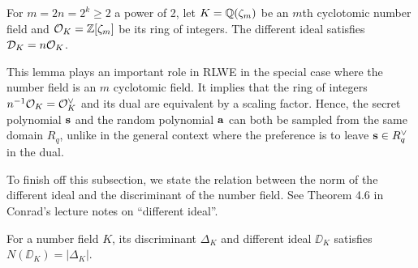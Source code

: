 \documentclass[../main.tex]{subfiles}
\begin{document}
\begin{lemma}
\label{app lm:difIdeal}
\reversemarginpar
{}
For $m=2n=2^k \ge 2$ a power of 2, let $K=\mathbb{Q}(\zeta_m)$ be an $m$th cyclotomic number field and $\mathcal{O}_K=\mathbb{Z}[\zeta_m]$ be its ring of integers. The different ideal satisfies $\mathcal{D}_K = n \mathcal{O}_K$.
\end{lemma}
This lemma plays an important role in RLWE in the special case where the number field is an $m$ cyclotomic field. It implies that the ring of integers $n^{-1}\mathcal{O}_K=\mathcal{O}_K^{\vee}$ and its dual are equivalent by a scaling factor. Hence, the secret polynomial $\mathbf{s}$ and the random polynomial $\mathbf{a}$ can both be sampled from the same domain $R_q$, unlike in the general context where the preference is to leave $\mathbf{s} \in R_q^{\vee}$ in the dual. 

To finish off this subsection, we state the relation between the norm of the different ideal and the discriminant of the number field. See Theorem 4.6 in Conrad's lecture notes on ``different ideal''.

\begin{theorem}
For a number field $K$, its discriminant $\Delta_K$ and different ideal $\DD_K$ satisfies $N(\DD_K)=|\Delta_K|$.
\end{theorem}
\iffalse
\begin{proof}
To sketch the proof. Given an integral basis $\{e_1, \dots, e_n\}$ of $\OO_K$ and its dual basis $\{\dual{e_1}, \dots, \dual{e_n}\}$ for $\dual{\OO_K}$. Since $\DD_K$ is also an integral ideal of $\OO_K$ and the norm of an ideal is its index in the ring, so $N(\DD_K)=[\dual{\OO_K}:\OO_K]$ (derivation skipped). The index is 
\end{proof}
\fi 

%
%
\end{document}
